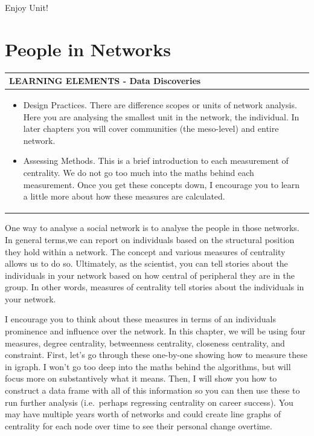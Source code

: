 \documentclass[
  letterpaper,
  DIV=11,
  numbers=noendperiod]{scrreprt}
\begin{document}
Enjoy Unit!

\chapter{People in Networks}\label{people-in-networks}

\begin{longtable}[]{@{}
  >{\raggedright\arraybackslash}p{}@{}}
\toprule\noalign{}
\begin{minipage}[b]{\linewidth}\raggedright
LEARNING ELEMENTS - Data Discoveries
\end{minipage} \\
\midrule\noalign{}
\endhead
\bottomrule\noalign{}
\endlastfoot
\begin{minipage}[t]{\linewidth}\raggedright
\begin{itemize}
\item
  Design Practices. There are difference scopes or units of network
  analysis. Here you are analysing the smallest unit in the network, the
  individual. In later chapters you will cover communities (the
  meso-level) and entire network.
\item
  Assessing Methods. This is a brief introduction to each measurement of
  centrality. We do not go too much into the maths behind each
  measurement. Once you get these concepts down, I encourage you to
  learn a little more about how these measures are calculated.
\end{itemize}
\end{minipage} \\
\end{longtable}

One way to analyse a social network is to analyse the people in those
networks. In general terms,we can report on individuals based on the
structural position they hold within a network. The concept and various
measures of centrality allows us to do so. Ultimately, as the scientist,
you can tell stories about the individuals in your network based on how
central of peripheral they are in the group. In other words, measures of
centrality tell stories about the individuals in your network.

I encourage you to think about these measures in terms of an individuals
prominence and influence over the network. In this chapter, we will be
using four measures, degree centrality, betweenness centrality,
closeness centrality, and constraint. First, let's go through these
one-by-one showing how to measure these in igraph. I won't go too deep
into the maths behind the algorithms, but will focus more on
substantively what it means. Then, I will show you how to construct a
data frame with all of this information so you can then use these to run
further analysis (i.e.~perhaps regressing centrality on career success).
You may have multiple years worth of networks and could create line
graphs of centrality for each node over time to see their personal
change overtime.
\end{document}
